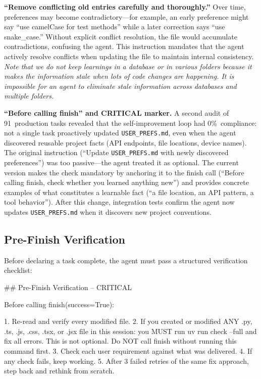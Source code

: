 \documentclass{article}
\begin{document}
\textbf{``Remove conflicting old entries carefully and thoroughly.''}  Over time, preferences may become contradictory---for example, an early preference might say ``use camelCase for test methods'' while a later correction says ``use snake\_case.'' Without explicit conflict resolution, the file would accumulate contradictions, confusing the agent.  This instruction mandates that the agent actively resolve conflicts when updating the file to maintain internal consistency.  \emph{Note that we do not keep learnings in a database or in various folders because it makes the information stale when lots of code changes are happening.  It is impossible for an agent to eliminate stale information across databases and multiple folders.}

\textbf{``Before calling finish'' and CRITICAL marker.}  A second audit of 91~production tasks revealed that the self-improvement loop had 0\%~compliance: not a single task proactively updated \texttt{USER\_PREFS.md}, even when the agent discovered reusable project facts (API endpoints, file locations, device names).  The original instruction (``Update \texttt{USER\_PREFS.md} with newly discovered preferences'') was too passive---the agent treated it as optional.  The current version makes the check mandatory by anchoring it to the finish call (``Before calling finish, check whether you learned anything new'') and provides concrete examples of what constitutes a learnable fact (``a file location, an API pattern, a tool behavior'').  After this change, integration tests confirm the agent now updates \texttt{USER\_PREFS.md} when it discovers new project conventions.

\subsection{Pre-Finish Verification}

Before declaring a task complete, the agent must pass a structured verification checklist:

\begin{prompt}
## Pre-Finish Verification -- CRITICAL

Before calling finish(success=True):

1. Re-read and verify every modified file.
2. If you created or modified ANY .py, .ts, .js, .css,
   .tsx, or .jsx file in this session: you MUST run
   uv run check --full and fix all errors. This is not
   optional. Do NOT call finish without running this
   command first.
3. Check each user requirement against what was
   delivered.
4. If any check fails, keep working.
5. After 3 failed retries of the same fix approach,
   step back and rethink from scratch.
\end{prompt}
\end{document}
